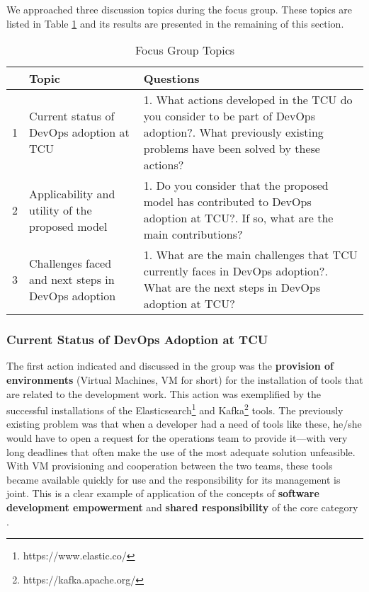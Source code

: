We approached three discussion topics during the focus group. These topics are
listed in Table \ref{table_topics} and its results are presented in the
remaining of this section.

\begin{table}[t]
\centering
\begin{tabular}{|p{0.2cm}|p{3.4cm}|p{10cm}|} \hline
& \textbf{Topic} & \textbf{Questions} \\ \hline

1 & Current status of DevOps adoption at TCU &
1. What actions developed in the TCU do you consider to be part of DevOps adoption?\newline\newline
2. What previously existing problems have been solved by these actions? \\ \hline

2 & Applicability and utility of the proposed model &
1. Do you consider that the proposed model has contributed to DevOps adoption at TCU?\newline\newline
2. If so, what are the main contributions? \\ \hline

3 & Challenges faced and next steps in DevOps adoption &
1. What are the main challenges that TCU currently faces in DevOps adoption?\newline\newline
2. What are the next steps in DevOps adoption at TCU?\\ \hline

\end{tabular}
\caption{Focus Group Topics}
\label{table_topics}
\end{table}


\subsubsection{Current Status of DevOps Adoption at TCU}

The first action indicated and discussed in the group was the \textbf{provision of
  environments} (Virtual Machines, VM for short)
for the installation of tools that are related
to the development work. This action was exemplified by the successful
installations of the Elasticsearch\footnote{https://www.elastic.co/} and
Kafka\footnote{https://kafka.apache.org/} tools. The previously existing problem
was that when a developer had a need of tools like these,
he/she would have to open a
request for the operations team to provide it---with very long deadlines that often make
the use of the most adequate solution unfeasible. With VM provisioning and
cooperation between the two teams, these tools became available quickly for use
and the responsibility for its management is joint. This is a clear example of
application of the concepts of \textbf{software development empowerment} and
\textbf{shared responsibility} of the core category \cc.

